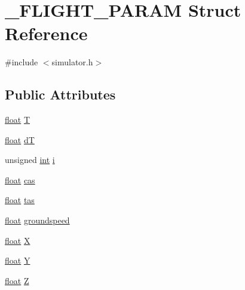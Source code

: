 \hypertarget{struct___f_l_i_g_h_t___p_a_r_a_m}{\section{\-\_\-\-F\-L\-I\-G\-H\-T\-\_\-\-P\-A\-R\-A\-M Struct Reference}
\label{struct___f_l_i_g_h_t___p_a_r_a_m}
}


{\ttfamily \#include $<$simulator.\-h$>$}

\subsection*{Public Attributes}
\begin{DoxyCompactItemize}
\item 
\hyperlink{_super_l_u_support_8h_a6a1bb6ed41f44b60e7bd83b0e9945aa7}{float} \hyperlink{group___h_i_t_l_plugin_ga6c3abbd8306a5eb69384ca36f338991b}{T}
\item 
\hyperlink{_super_l_u_support_8h_a6a1bb6ed41f44b60e7bd83b0e9945aa7}{float} \hyperlink{group___h_i_t_l_plugin_gabba6faff155324d93353abc952708700}{d\-T}
\item 
unsigned \hyperlink{ioapi_8h_a787fa3cf048117ba7123753c1e74fcd6}{int} \hyperlink{group___h_i_t_l_plugin_gafd95bf6c88f8e93baff6c5e27a5508a4}{i}
\item 
\hyperlink{_super_l_u_support_8h_a6a1bb6ed41f44b60e7bd83b0e9945aa7}{float} \hyperlink{group___h_i_t_l_plugin_ga2fbe36224e421144a3822791ccd78c7b}{cas}
\item 
\hyperlink{_super_l_u_support_8h_a6a1bb6ed41f44b60e7bd83b0e9945aa7}{float} \hyperlink{group___h_i_t_l_plugin_gad3fafd24c05ec4da9b2b230dfe6eec23}{tas}
\item 
\hyperlink{_super_l_u_support_8h_a6a1bb6ed41f44b60e7bd83b0e9945aa7}{float} \hyperlink{group___h_i_t_l_plugin_ga2a4535a23a5ca83f655298d2494556d5}{groundspeed}
\item 
\hyperlink{_super_l_u_support_8h_a6a1bb6ed41f44b60e7bd83b0e9945aa7}{float} \hyperlink{group___h_i_t_l_plugin_ga55a42deedc5785d55c570ae908bcc46a}{X}
\item 
\hyperlink{_super_l_u_support_8h_a6a1bb6ed41f44b60e7bd83b0e9945aa7}{float} \hyperlink{group___h_i_t_l_plugin_gafb4f835313c27ac7b01fe3eb77b6bacc}{Y}
\item 
\hyperlink{_super_l_u_support_8h_a6a1bb6ed41f44b60e7bd83b0e9945aa7}{float} \hyperlink{group___h_i_t_l_plugin_gacb21381efc860b328d0be136ef53f98c}{Z}
\item 

\end{DoxyCompactItemize}
